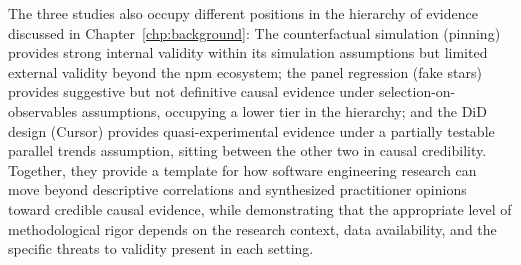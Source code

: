 The three studies also occupy different positions in the hierarchy of evidence discussed in Chapter~\ref{chp:background}: The counterfactual simulation (pinning) provides strong internal validity within its simulation assumptions but limited external validity beyond the npm ecosystem; the panel regression (fake stars) provides suggestive but not definitive causal evidence under selection-on-observables assumptions, occupying a lower tier in the hierarchy; and the DiD design (Cursor) provides quasi-experimental evidence under a partially testable parallel trends assumption, sitting between the other two in causal credibility.
Together, they provide a template for how software engineering research can move beyond descriptive correlations and synthesized practitioner opinions toward credible causal evidence, while demonstrating that the appropriate level of methodological rigor depends on the research context, data availability, and the specific threats to validity present in each setting.
